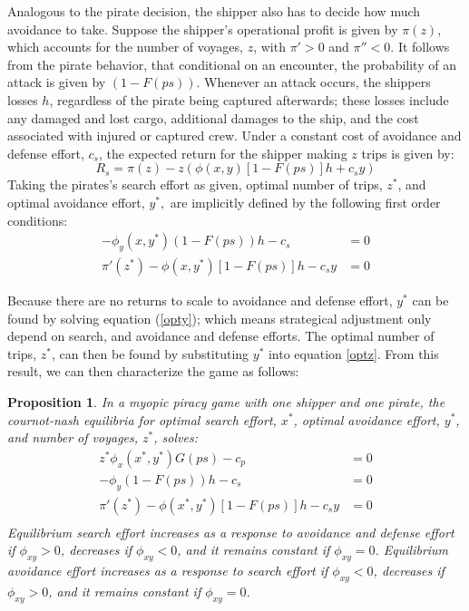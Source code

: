 \documentclass[11pt, oneside]{article}   	%
\newtheorem{proposition}{Proposition}
\begin{document}
Analogous to the pirate decision, the shipper also has to decide how much avoidance to take. Suppose the shipper's operational profit is given by $\pi(z)$, which accounts for the number of voyages, $z$, with $\pi'>0$ and $\pi''<0$. It follows from the pirate behavior, that conditional on an encounter, the probability of an attack is given by $(1-F(ps))$. Whenever an attack occurs, the shippers losses $h$, regardless of the pirate being captured afterwards; these losses include any damaged and lost cargo, additional damages to the ship, and the cost associated with injured or captured crew. Under a constant cost of avoidance and defense effort, $c_s$, the expected return for the shipper making $z$ trips is given by:
\begin{equation}
R_s=\pi(z)-z\left(\phi(x,y)[1-F(ps)]h+c_sy\right)
\end{equation}
Taking the pirates's search effort as given, optimal number of trips, $z^*$, and optimal avoidance effort, $y^*,$ are implicitly defined by the following first order conditions:
\begin{align}
-\phi_y(x,y^*)\left(1-F(ps)\right)h-c_s&=0\label{opty}\\
\pi'(z^*)-\phi(x,y^*)[1-F(ps)]h-c_sy&=0 \label{optz}
\end{align}

Because there are no returns to scale to avoidance and defense effort, $y^*$ can be found by solving equation (\ref{opty}); which means strategical adjustment only depend on search, and avoidance and defense efforts. The optimal number of trips, $z^*$, can then be found by substituting $y^*$ into equation \ref{optz}. From this result, we can then characterize the game as follows:
\begin{proposition}
In a myopic piracy game with one shipper and one pirate, the cournot-nash equilibria for optimal search effort, $x^*$, optimal avoidance effort, $y^*$, and number of voyages, $z^*$, solves:
\begin{align*}
z^*\phi_x(x^*,y^*)G(ps)-c_p&=0\\
-\phi_y\left(1-F(ps)\right)h-c_s&=0\\
\pi'(z^*)-\phi(x^*,y^*)[1-F(ps)]h-c_sy&=0 \\
\end{align*}
Equilibrium search effort increases as a response to avoidance and defense effort if $\phi_{xy}>0$, decreases if $\phi_{xy}<0$, and it remains constant if $\phi_{xy}=0$.
Equilibrium avoidance effort increases as a response to search effort if $\phi_{xy}<0$, decreases if $\phi_{xy}>0$, and it remains constant if $\phi_{xy}=0$.  
\end{proposition}
\end{document}
